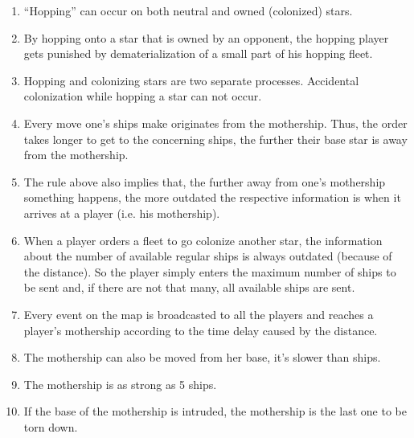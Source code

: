 \begin{enumerate}
	\item ``Hopping'' can occur on both neutral and owned (colonized) stars.
	\item By hopping onto a star that is owned by an opponent, the hopping player gets punished by dematerialization of a small part of his hopping fleet.
	\item Hopping and colonizing stars are two separate processes. Accidental colonization while hopping a star can not occur.
	\item Every move one’s ships make originates from the mothership. Thus, the order takes longer to get to the concerning ships, the further their base star is away from the mothership.
	\item The rule above also implies that, the further away from one's mothership something happens, the more outdated the respective information is when it arrives at a player (i.e. his mothership).
	\item When a player orders a fleet to go colonize another star, the information about the number of available regular ships is always outdated (because of the distance). So the player simply enters the maximum number of ships to be sent and, if there are not that many, all available ships are sent.
	\item Every event on the map is broadcasted to all the players and reaches a player's mothership according to the time delay caused by the distance.
	\item The mothership can also be moved from her base, it's slower than ships.
	\item The mothership is as strong as 5 ships.
	\item If the base of the mothership is intruded, the mothership is the last one to be torn down.
\end{enumerate}